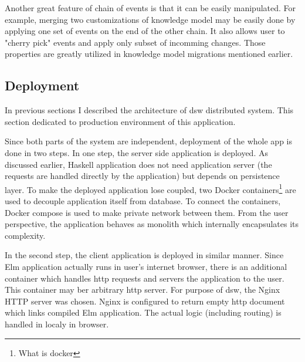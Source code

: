 Another great feature of chain of events is that it can be easily manipulated.
For example, merging two customizations of knowledge model may be easily done by applying one set of events on the end of the other chain.
It also allows user to "cherry pick" events and apply only subset of incomming changes.
Those properties are greatly utilized in knowledge model migrations mentioned earlier.

\subsection{Deployment}

In previous sections I described the architecture of \gls{dsw} distributed system.
This section dedicated to production environment of this application.

Since both parts of the system are independent, deployment of the whole app is done in two steps.
In one step, the server side application is deployed.
As discussed earlier, Haskell application does not need application server (the requests are handled directly by the application) but depends on persistence layer.
To make the deployed application lose coupled, two Docker containers\footnote{What is docker} are used to decouple application itself from database.
To connect the containers, Docker compose is used to make private network between them.
From the user perspective, the application behaves as monolith which internally encapsulates its complexity.

In the second step, the client application is deployed in similar manner.
Since Elm application actually runs in user's internet browser, there is an additional container which handles \gls{http} requests and servers the application to the user.
This container may ber arbitrary \gls{http} server.
For purpose of \gls{dsw}, the Nginx HTTP server was chosen.
Nginx is configured to return empty \gls{http} document which links compiled Elm application.
The actual logic (including routing) is handled in localy in browser.

